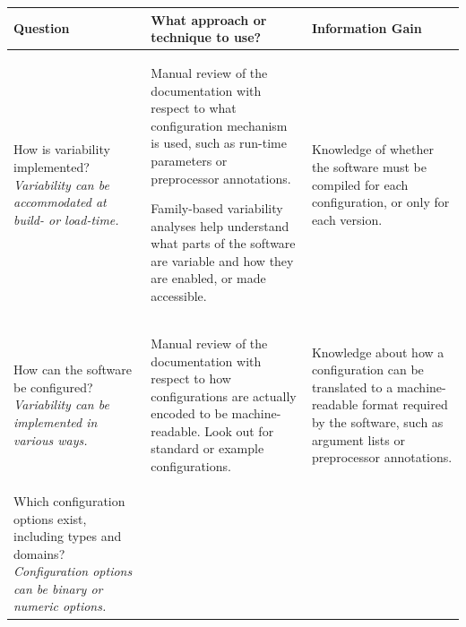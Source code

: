 \begin{table}
  \centering
  
  \begin{tabular}{L{0.22\textwidth} L{0.48\textwidth} L{0.3\textwidth}}
  
  	\toprule 
    {\bf Question} & {\bf What approach or technique to use?} & {\bf
    Information Gain} \\
    \midrule
    
    {How is variability implemented?\linebreak
	{\footnotesize\it Variability can be accommodated at build- or 	load-time.}} & 
	
	{\smaller\begin{compactitem}
	  \item Manual review of the documentation with respect to what configuration
	  mechanism is used, such as run-time parameters or preprocessor annotations.
	  \item Family-based variability analyses help understand what parts of the
	  software are variable and how they are enabled, or made accessible.	  
	\end{compactitem}} & 
	
	{Knowledge of whether the software must be compiled for each configuration, or only for each version.}\\
	
	\midrule
	
	{How can the software be configured?\linebreak
	{\footnotesize\it Variability can be implemented in various ways.}} &
	
	{\smaller\begin{compactitem}
	  \item Manual review of the documentation with respect to how configurations
	  are actually encoded to be machine-readable. Look out for standard or example
	  configurations.
	 \end{compactitem}}
	  &
	
	{Knowledge about how a configuration can be translated to a machine-readable
	format required by the software, such as argument lists or preprocessor annotations.}\\
	
	\midrule
	
	{Which configuration options exist, including types and domains?\linebreak
	{\footnotesize\it Configuration options can be binary or numeric options.}} & 
	

\end{tabular}
\end{table}
